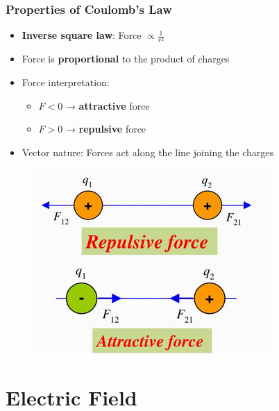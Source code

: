 \documentclass{beamer}
\begin{document}
\begin{frame}
    \frametitle{Properties of Coulomb's Law}
    \begin{itemize}
        \item \textbf{Inverse square law}: Force $\propto \frac{1}{r^2}$
        \item Force is \textbf{proportional} to the product of charges
        \item Force interpretation:
            \begin{itemize}
                \item $F < 0$ → \textbf{attractive} force
                \item $F > 0$ → \textbf{repulsive} force
            \end{itemize}
        \item Vector nature: Forces act along the line joining the charges
    \end{itemize}
    
    
       \begin{figure}
           \centering
           \includegraphics[width=1\linewidth]{frfrdst.png}
       \end{figure}
    
\end{frame}

\section{Electric Field}
\end{document}

